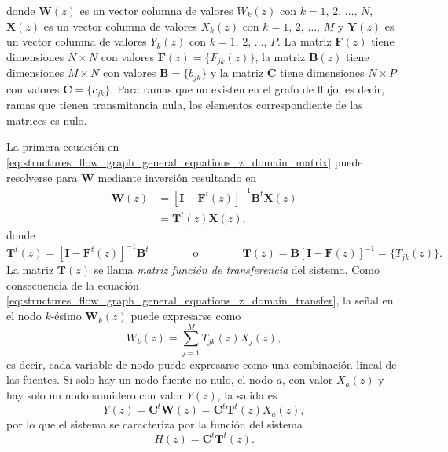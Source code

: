 \documentclass[a4paper]{report}
\newcommand{\I}{\mathbf{I}} %
\newcommand{\C}{\mathbf{C}} %
\newcommand{\B}{\mathbf{B}}
\newcommand{\F}{\mathbf{F}}
\newcommand{\T}{\mathbf{T}}
\newcommand{\W}{\mathbf{W}}
\newcommand{\X}{\mathbf{X}}
\newcommand{\Y}{\mathbf{Y}}
\begin{document}
donde \(\W(z)\) es un vector columna de valores \(W_k(z)\) con \(k=1,\,2,\,\dots,\,N\), \(\X(z)\) es un vector columna de valores \(X_k(z)\) con \(k=1,\,2,\,\dots,\,M\) y \(\Y(z)\) es un vector columna de valores \(Y_k(z)\) con \(k=1,\,2,\,\dots,\,P\). La matriz \(\F(z)\) tiene dimensiones \(N\times N\) con valores \(\F(z)=\{F_{jk}(z)\}\), la matriz \(\B(z)\) tiene dimensiones \(M\times N\) con valores \(\B=\{b_{jk}\}\) y la matriz \(\C\) tiene dimensiones \(N\times P\) con valores \(\C=\{c_{jk}\}\). Para ramas que no existen en el grafo de flujo, es decir, ramas que tienen transmitancia nula, los elementos correspondiente de las matrices es nulo.

La primera ecuación en \ref{eq:structures_flow_graph_general_equations_z_domain_matrix} puede resolverse para \(\W\) mediante inversión resultando en
\begin{equation}\label{eq:structures_flow_graph_general_equations_z_domain_transfer}
 \begin{aligned}
  \W(z)&=[\I-\F^t(z)]^{-1}\B^t\X(z)\\
    &=\T^t(z)\X(z),
 \end{aligned}
\end{equation}
donde
\[
 \T^t(z)=[\I-\F^t(z)]^{-1}\B^t
 \qquad\qquad\textrm{o}\qquad\qquad
 \T(z)=\B[\I-\F(z)]^{-1}=\{T_{jk}(z)\}.
\]
La matriz \(\T(z)\) se llama \emph{matriz función de transferencia} del sistema. Como consecuencia de la ecuación \ref{eq:structures_flow_graph_general_equations_z_domain_transfer}, la señal en el nodo \(k\)-ésimo \(\W_k(z)\) puede expresarse como
\[
 W_k(z)=\sum_{j=1}^M T_{jk}(z)X_j(z),
\]
es decir, cada variable de nodo puede expresarse como una combinación lineal de las fuentes. Si solo hay un nodo fuente no nulo, el nodo \(a\), con valor \(X_a(z)\) y hay solo un nodo sumidero con valor \(Y(z)\), la salida es
\[
 Y(z)=\C^t\W(z)=\C^t\T^t(z)X_a(z), 
\]
por lo que el sistema se caracteriza por la función del sistema
\[
 H(z)=\C^t\T^t(z).
\]
\end{document}
